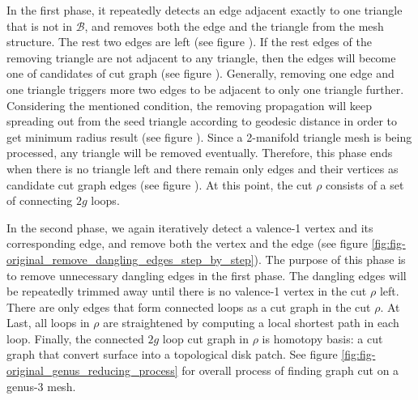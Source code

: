 \documentclass[a4paper,twoside]{article}
\begin{document}
In the first phase, it repeatedly detects an edge adjacent exactly to one triangle that is not in $\mathscr{B}$, and removes both the edge and the triangle from the mesh structure. The rest two edges are left (see figure ). If the rest edges of the removing triangle are not adjacent to any triangle, then the edges will become one of candidates of cut graph (see figure ). Generally, removing one edge and one triangle triggers more two edges to be adjacent to only one triangle further. Considering the mentioned condition, the removing propagation will keep spreading out from the seed triangle according to geodesic distance in order to get minimum radius result (see figure ). Since a 2-manifold triangle mesh is being processed, any triangle will be removed eventually. Therefore, this phase ends when there is no triangle left and there remain only edges and their vertices as candidate cut graph edges (see figure ). At this point, the cut $\rho$ consists of a set of connecting $2g$ loops.

In the second phase, we again iteratively detect a valence-1 vertex and its corresponding edge, and remove both the vertex and the edge (see figure \ref{fig:fig-original_remove_dangling_edges_step_by_step}). The purpose of this phase is to remove unnecessary dangling edges in the first phase. The dangling edges will be repeatedly trimmed away until there is no valence-1 vertex in the cut $\rho$ left. There are only edges that form connected loops as a cut graph in the cut $\rho$. At Last, all loops in $\rho$ are straightened by computing a local shortest path in each loop. Finally, the connected $2g$ loop cut graph in $\rho$ is homotopy basis: a cut graph that convert surface into a topological disk patch. See figure \ref{fig:fig-original_genus_reducing_process} for overall process of finding graph cut on a genus-3 mesh.
\end{document}
